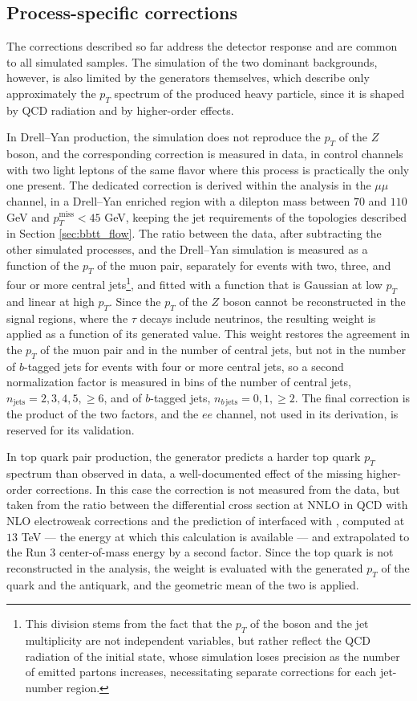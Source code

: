 \subsection{Process-specific corrections}
\label{subsec:bbtt_process_corrections}
%
The corrections described so far address the detector response and are common to all simulated samples. The simulation of the two dominant backgrounds, however, is also limited by the generators themselves, which describe only approximately the $p_T$ spectrum of the produced heavy particle, since it is shaped by QCD radiation and by higher-order effects.\medskip

In Drell--Yan production, the simulation does not reproduce the $p_T$ of the $Z$ boson, and the corresponding correction is measured in data, in control channels with two light leptons of the same flavor where this process is practically the only one present. The dedicated correction is derived within the analysis in the $\mu\mu$ channel, in a Drell--Yan enriched region with a dilepton mass between $70$ and $110$ GeV and $p_T^\text{miss} < 45$ GeV, keeping the jet requirements of the topologies described in Section \ref{sec:bbtt_flow}. The ratio between the data, after subtracting the other simulated processes, and the Drell--Yan simulation is measured as a function of the $p_T$ of the muon pair, separately for events with two, three, and four or more central jets\footnote{This division stems from the fact that the $p_T$ of the boson and the jet multiplicity are not independent variables, but rather reflect the QCD radiation of the initial state, whose simulation loses precision as the number of emitted partons increases, necessitating separate corrections for each jet-number region.}, and fitted with a function that is Gaussian at low $p_T$ and linear at high $p_T$. Since the $p_T$ of the $Z$ boson cannot be reconstructed in the signal regions, where the $\tau$ decays include neutrinos, the resulting weight is applied as a function of its generated value. This weight restores the agreement in the $p_T$ of the muon pair and in the number of central jets, but not in the number of $b$-tagged jets for events with four or more central jets, so a second normalization factor is measured in bins of the number of central jets, $n_\text{jets} = 2, 3, 4, 5, \geq 6$, and of $b$-tagged jets, $n_{b\,\text{jets}} = 0, 1, \geq 2$. The final correction is the product of the two factors, and the $ee$ channel, not used in its derivation, is reserved for its validation.\medskip

In top quark pair production, the generator predicts a harder top quark $p_T$ spectrum than observed in data, a well-documented effect of the missing higher-order corrections. In this case the correction is not measured from the data, but taken from the ratio between the differential cross section at NNLO in QCD with NLO electroweak corrections and the prediction of \POWHEG{} interfaced with \PYTHIA{}, computed at $13$ TeV  — the energy at which this calculation is available — and extrapolated to the Run 3 center-of-mass energy by a second factor. Since the top quark is not reconstructed in the analysis, the weight is evaluated with the generated $p_T$ of the quark and the antiquark, and the geometric mean of the two is applied.\medskip

